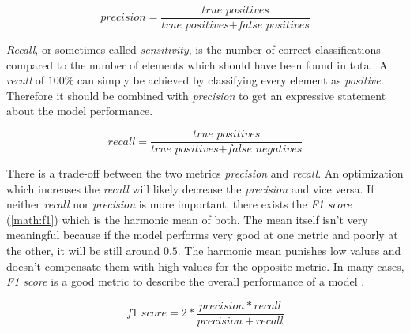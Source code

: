 \begin{equation}
    \label{math:precision}
    precision = \frac{\textit{true positives}}{\textit{true positives} + \textit{false positives}}
\end{equation}

\emph{Recall}, or sometimes called \emph{sensitivity}, is the number of correct classifications compared to the number of elements
which should have been found in total. A \emph{recall} of $100\%$ can simply be achieved by classifying every element as \emph{positive}.
Therefore it should be combined with \emph{precision} to get an expressive statement about the model performance.

\begin{equation}
    \label{math:recall}
    recall = \frac{\textit{true positives}}{\textit{true positives} + \textit{false negatives}}
\end{equation}

There is a trade-off between the two metrics \emph{precision} and \emph{recall}. An optimization which increases the \emph{recall}
will likely decrease the \emph{precision} and vice versa. If neither \emph{recall} nor \emph{precision} is more important, there
exists the \emph{F1 score} (\ref{math:f1}) which is the harmonic mean of both. The mean itself isn't very meaningful because if the
model performs very good at one metric and poorly at the other, it will be still around $0.5$. The harmonic mean punishes low values
and doesn't compensate them with high values for the opposite metric. In many cases, \emph{F1 score} is a good metric to describe the
overall performance of a model \cite{Grus15}.

\begin{equation}
    \label{math:f1}
    \textit{f1 score} = 2 * \frac{precision * recall}{precision + recall}
\end{equation}
